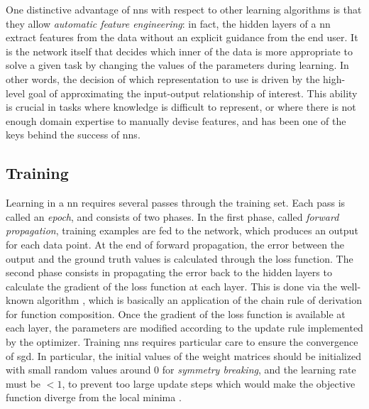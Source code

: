 One distinctive advantage of \glspl{nn} with respect to other learning algorithms is that they allow \emph{automatic feature engineering}: in fact, the hidden layers of a \gls{nn} extract features from the data without an explicit guidance from the end user. It is the network itself that decides which inner  of the data is more appropriate to solve a given task by changing the values of the parameters during learning. In other words, the decision of which representation to use is driven by the high-level goal of approximating the input-output relationship of interest. This ability is crucial in tasks where knowledge is difficult to represent, or where there is not enough domain expertise to manually devise features, and has been one of the keys behind the success of \glspl{nn}.

\subsection{Training}\label{sec:training}
Learning in a \gls{nn} requires several passes through the training set. Each pass is called an \emph{epoch}, and consists of two phases. In the first phase, called \emph{forward propagation}, training examples are fed to the network, which produces an output for each data point. At the end of forward propagation, the error between the output and the ground truth values is calculated through the loss function. The second phase consists in propagating the error back to the hidden layers to calculate the gradient of the loss function at each layer. This is done via the well-known  algorithm \citep{rumelhart1986backprop}, which is basically an application of the chain rule of derivation for function composition. Once the gradient of the loss function is available at each layer, the parameters are modified according to the update rule implemented by the optimizer. Training \glspl{nn} requires particular care to ensure the convergence of \gls{sgd}. In particular, the initial values of the weight matrices should be initialized with small random values around 0 for \emph{symmetry breaking}, and the learning rate must be $< 1$, to prevent too large update steps which would make the objective function diverge from the local minima \citep{lecun1998backprop}.

